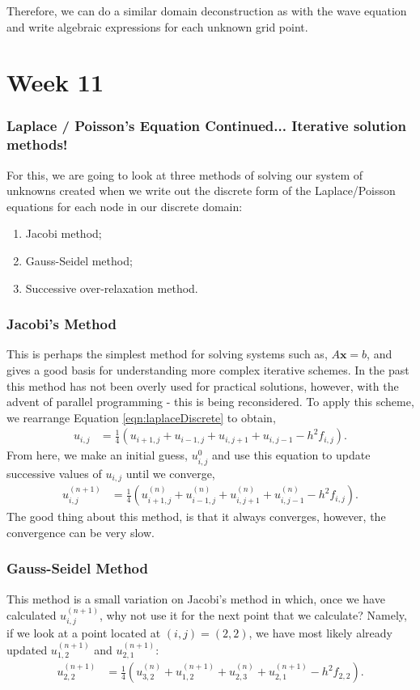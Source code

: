 \documentclass[11pt,a4paper]{report}
\begin{document}
			Therefore, we can do a similar domain deconstruction as with the wave equation and write algebraic expressions for each unknown grid point.
	\section{Week 11}
		\subsubsection{Laplace / Poisson's Equation Continued... Iterative solution methods!}
			For this, we are going to look at three methods of solving our system of unknowns created when we write out the discrete form of the Laplace/Poisson equations for each node in our discrete domain:
			\begin{enumerate}
				\item Jacobi method;
				\item Gauss-Seidel method;
				\item Successive over-relaxation method.
			\end{enumerate}
		
		\subsubsection{Jacobi's Method}
			This is perhaps the simplest method for solving systems such as, $A\mathbf{x} = b$, and gives a good basis for understanding more complex iterative schemes. In the past this method has not been overly used for practical solutions, however, with the advent of parallel programming - this is being reconsidered. To apply this scheme, we rearrange Equation \ref{eqn:laplaceDiscrete} to obtain,
			\begin{align}
				u_{i,j} &= \frac{1}{4} \left( u_{i+1,j} + u_{i-1,j} + u_{i,j+1} + u_{i,j-1} - h^2 f_{i,j} \right).
			\end{align}
			From here, we make an initial guess, $u_{i,j}^0$ and use this equation to update successive values of $u_{i,j}$ until we converge,
			\begin{align}
				u_{i,j}^{(n+1)} &= \frac{1}{4} \left( u_{i+1,j}^{(n)} + u_{i-1,j}^{(n)} + u_{i,j+1}^{(n)} + u_{i,j-1}^{(n)} - h^2 f_{i,j} \right).
			\end{align}
			The good thing about this method, is that it always converges, however, the convergence can be very slow.
			
		\subsubsection{Gauss-Seidel Method}
			This method is a small variation on Jacobi's method in which, once we have calculated $u_{i,j}^{(n+1)}$, why not use it for the next point that we calculate? Namely, if we look at a point located at $(i,j)=(2,2)$, we have most likely already updated $u_{1,2}^{(n+1)}$ and $u_{2,1}^{(n+1)}$:
			\begin{align}
				u_{2,2}^{(n+1)} &= \frac{1}{4} \left( u_{3,2}^{(n)} + u_{1,2}^{(n+1)} + u_{2,3}^{(n)} + u_{2,1}^{(n+1)} - h^2 f_{2,2} \right).
			\end{align}
			
\end{document}
